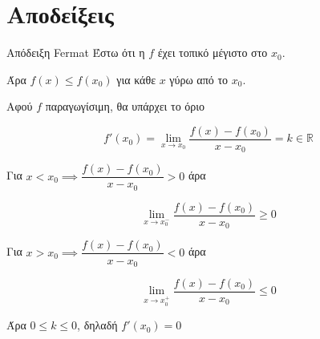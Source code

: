\documentclass{presentation}
\begin{document}
\section{Αποδείξεις}
\begin{frame}[label=Απόδειξη1]{Απόδειξη Fermat}
     Έστω ότι η $f$ έχει τοπικό μέγιστο στο $x_0$.

    Άρα $f(x)\le f(x_0)$ για κάθε $x$ γύρω από το $x_0$.

     Αφού $f$ παραγωγίσιμη, θα υπάρχει το όριο

    $$f'(x_0)=\lim\limits_{x \to x_0}{ \dfrac{f(x)-f(x_0)}{x-x_0} }=k\in\mathbb{R}$$

     Για $x<x_0\implies \dfrac{f(x)-f(x_0)}{x-x_0} >0$ άρα

    $$\lim\limits_{x \to x_0^-}{ \dfrac{f(x)-f(x_0)}{x-x_0} }\ge 0$$

     Για $x>x_0\implies \dfrac{f(x)-f(x_0)}{x-x_0} <0$ άρα

    $$\lim\limits_{x \to x_0^+}{ \dfrac{f(x)-f(x_0)}{x-x_0} }\le 0$$

     Άρα $0\le k \le 0$, δηλαδή $f'(x_0)=0$ \hyperlink{Θεώρημα1}{}
\end{frame}
\end{document}
